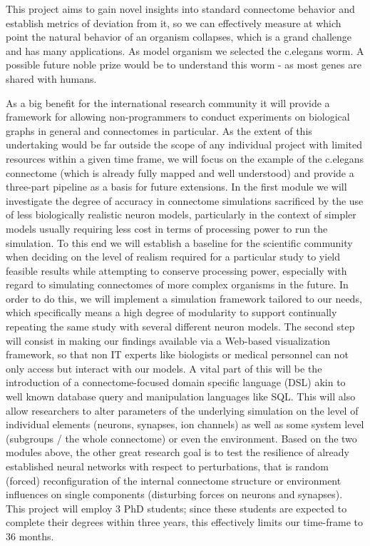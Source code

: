 \documentclass[a4paper,11pt]{article}
\begin{document}
This project aims to gain novel insights into standard connectome behavior and establish metrics of deviation from it, so we can effectively measure at which point the natural behavior of an organism collapses, which is a grand challenge and has many applications. As model organism we selected the c.elegans worm. A possible future noble prize would be to understand this worm - as most genes are shared with humans.

As a big benefit for the international research community it will provide a framework for allowing non-programmers to conduct experiments on biological graphs in general and connectomes in particular. As the extent of this undertaking would be far outside the scope of any individual project with limited resources within a given time frame, we will focus on the example of the c.elegans connectome (which is already fully mapped and well understood) and provide a three-part pipeline as a basis for future extensions. In the first module we will investigate the degree of accuracy in connectome simulations sacrificed by the use of less biologically realistic neuron models, particularly in the context of simpler models usually requiring less cost in terms of processing power to run the simulation. To this end we will establish a baseline for the scientific community when deciding on the level of realism required for a particular study to yield feasible results while attempting to conserve processing power, especially with regard to simulating connectomes of more complex organisms in the future. In order to do this, we will implement a simulation framework tailored to our needs, which specifically means a high degree of modularity to support continually repeating the same study with several different neuron models. The second step will consist in making our findings available via a Web-based visualization framework, so that non IT experts like biologists or medical personnel can not only access but interact with our models. A vital part of this will be the introduction of a connectome-focused domain specific language (DSL) akin to well known database query and manipulation languages like SQL. This will also allow researchers to alter parameters of the underlying simulation on the level of individual elements (neurons, synapses, ion channels) as well as some system level (subgroups / the whole connectome) or even the environment. Based on the two modules above, the other great research goal is to test the resilience of already established neural networks with respect to perturbations, that is random (forced) reconfiguration of the internal connectome structure or environment influences on single components (disturbing forces on neurons and synapses). This project will employ 3 PhD students; since these students are expected to complete their degrees within three years, this effectively limits our time-frame to 36 months.
\end{document}
